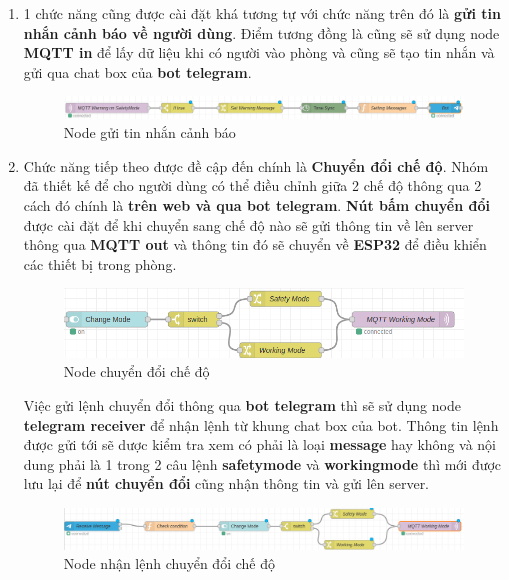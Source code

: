 \documentclass{report}
\begin{document}
\begin{enumerate}
    \item 1 chức năng cũng được cài đặt khá tương tự với chức năng trên đó là \textbf{gửi tin nhắn cảnh báo về người dùng}. Điểm tương đồng là cũng sẽ sử dụng node \textbf{MQTT in} để lấy dữ liệu khi có người vào phòng và cũng sẽ tạo tin nhắn và gửi qua chat box của \textbf{bot telegram}.
    \begin{figure}[H]
        \includegraphics[width=\textwidth, keepaspectratio]{img/flow/send_warning.png}
        \centering
        \caption{Node gửi tin nhắn cảnh báo}
    \end{figure}

    \item Chức năng tiếp theo được đề cập đến chính là \textbf{Chuyển đổi chế độ}. Nhóm đã thiết kế để cho người dùng có thể điều chỉnh giữa 2 chế độ thông qua 2 cách đó chính là \textbf{trên web và qua bot telegram}. \textbf{Nút bấm chuyển đổi} được cài đặt để khi chuyển sang chế độ nào sẽ gửi thông tin về lên server thông qua \textbf{MQTT out} và thông tin đó sẽ chuyển về \textbf{ESP32} để điều khiển các thiết bị trong phòng.
    \begin{figure}[H]
        \includegraphics[width=\textwidth, keepaspectratio]{img/flow/change_btn_mode.png}
        \centering
        \caption{Node chuyển đổi chế độ}
    \end{figure}
    Việc gửi lệnh chuyển đổi thông qua \textbf{bot telegram} thì sẽ sử dụng node \textbf{telegram receiver} để nhận lệnh từ khung chat box của bot. Thông tin lệnh được gửi tới sẽ dược kiểm tra xem có phải là loại \textbf{message} hay không và nội dung phải là 1 trong 2 câu lệnh \textbf{safetymode} và \textbf{workingmode} thì mới được lưu lại để \textbf{nút chuyển đổi} cũng nhận thông tin và gửi lên server.
    \begin{figure}[H]
        \includegraphics[width=\textwidth, keepaspectratio]{img/flow/bot_receiver.png}
        \centering
        \caption{Node nhận lệnh chuyển đổi chế độ}
    \end{figure}


\end{enumerate}
\end{document}
